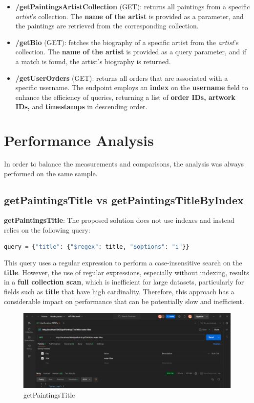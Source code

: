 \documentclass[a4paper,12pt]{article}
\begin{document}
\begin{itemize}
      \item \textbf{/getPaintingsArtistCollection} (GET): returns all paintings from a specific \textit{artist}'s collection. The \textbf{name of the artist} is provided as a parameter, and the paintings are retrieved from the corresponding collection.

      \item \textbf{/getBio} (GET): fetches the biography of a specific artist from the \textit{artist}'s collection. The \textbf{name of the artist} is provided as a query parameter, and if a match is found, the artist's biography is returned.

      \item \textbf{/getUserOrders} (GET): returns all orders that are associated with a specific username. The endpoint employs an \textbf{index} on the \textbf{username} field to enhance the efficiency of queries, returning a list of \textbf{order IDs, artwork IDs,} and \textbf{timestamps} in descending order.

\end{itemize}

\section{Performance Analysis}
In order to balance the measurements and comparisons, the analysis was always performed on the same sample.

\subsection{getPaintingsTitle vs getPaintingsTitleByIndex}


\textbf{getPaintingsTitle}: The proposed solution does not use indexes and instead relies on the following query:
\begin{lstlisting}[language=Python]
query = {"title": {"$regex": title, "$options": "i"}}
\end{lstlisting}
This query uses a regular expression to perform a case-insensitive search on the \textbf{title}. However, the use of regular expressions, especially without indexing, results in a \textbf{full collection scan}, which is inefficient for large datasets, particularly for fields such as \textbf{title} that have high cardinality. Therefore, this approach has a considerable impact on performance that can be potentially slow and inefficient.

\begin{figure}[h]
      \centering
      \includegraphics[width=1\textwidth]{images/getPaintingsTitleS.png}
      \caption{getPaintingsTitle}

\end{figure}
\end{document}
